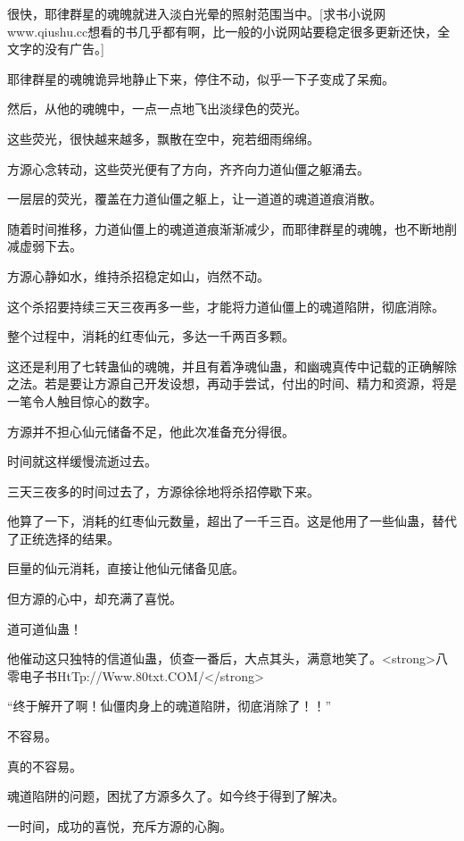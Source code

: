 
\begin{this_body}

很快，耶律群星的魂魄就进入淡白光晕的照射范围当中。[求书小说网www.qiushu.cc想看的书几乎都有啊，比一般的小说网站要稳定很多更新还快，全文字的没有广告。]

耶律群星的魂魄诡异地静止下来，停住不动，似乎一下子变成了呆痴。

然后，从他的魂魄中，一点一点地飞出淡绿色的荧光。

这些荧光，很快越来越多，飘散在空中，宛若细雨绵绵。

方源心念转动，这些荧光便有了方向，齐齐向力道仙僵之躯涌去。

一层层的荧光，覆盖在力道仙僵之躯上，让一道道的魂道道痕消散。

随着时间推移，力道仙僵上的魂道道痕渐渐减少，而耶律群星的魂魄，也不断地削减虚弱下去。

方源心静如水，维持杀招稳定如山，岿然不动。

这个杀招要持续三天三夜再多一些，才能将力道仙僵上的魂道陷阱，彻底消除。

整个过程中，消耗的红枣仙元，多达一千两百多颗。

这还是利用了七转蛊仙的魂魄，并且有着净魂仙蛊，和幽魂真传中记载的正确解除之法。若是要让方源自己开发设想，再动手尝试，付出的时间、精力和资源，将是一笔令人触目惊心的数字。

方源并不担心仙元储备不足，他此次准备充分得很。

时间就这样缓慢流逝过去。

三天三夜多的时间过去了，方源徐徐地将杀招停歇下来。

他算了一下，消耗的红枣仙元数量，超出了一千三百。这是他用了一些仙蛊，替代了正统选择的结果。

巨量的仙元消耗，直接让他仙元储备见底。

但方源的心中，却充满了喜悦。

道可道仙蛊！

他催动这只独特的信道仙蛊，侦查一番后，大点其头，满意地笑了。<strong>八零电子书HtTp://Www.80txt.COM/</strong>

“终于解开了啊！仙僵肉身上的魂道陷阱，彻底消除了！！”

不容易。

真的不容易。

魂道陷阱的问题，困扰了方源多久了。如今终于得到了解决。

一时间，成功的喜悦，充斥方源的心胸。


\end{this_body}
